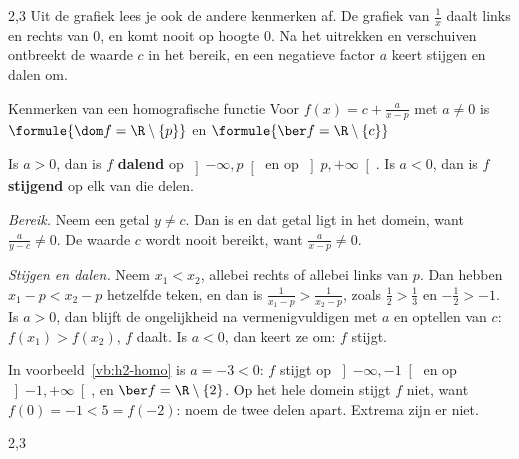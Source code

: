 \begin{alleenvoor}{2,3}
Uit de grafiek lees je ook de andere kenmerken af. De grafiek van $\frac1x$ daalt links en rechts van $0$, en komt nooit op hoogte $0$. Na het uitrekken en verschuiven ontbreekt de waarde $c$ in het bereik, en een negatieve factor $a$ keert stijgen en dalen om.

\begin{theorie}
\begin{stelling}{Kenmerken van een homografische functie}
Voor $f(x) = c + \frac{a}{x - p}$ met $a \neq 0$ is \quad $\formule{\dom f = \R \setminus \{p\}}$ \quad en \quad $\formule{\ber f = \R \setminus \{c\}}$

Is $a > 0$, dan is $f$ \textbf{\textcolor{accent}{dalend}} op $\left]-\infty, p\right[$ en op $\left]p, +\infty\right[$. Is $a < 0$, dan is $f$ \textbf{\textcolor{accent}{stijgend}} op elk van die delen.
\end{stelling}

\begin{bewijs}
\textit{Bereik.} Neem een getal $y \neq c$. Dan is
en dat getal ligt in het domein, want $\frac{a}{y - c} \neq 0$. De waarde $c$ wordt nooit bereikt, want $\frac{a}{x - p} \neq 0$.

\textit{Stijgen en dalen.} Neem $x_1 < x_2$, allebei rechts of allebei links van $p$. Dan hebben $x_1 - p < x_2 - p$ hetzelfde teken, en dan is $\frac{1}{x_1 - p} > \frac{1}{x_2 - p}$, zoals $\frac12 > \frac13$ en $-\frac12 > -1$. Is $a > 0$, dan blijft de ongelijkheid na vermenigvuldigen met $a$ en optellen van $c$: $f(x_1) > f(x_2)$, $f$ daalt. Is $a < 0$, dan keert ze om: $f$ stijgt.
\end{bewijs}
\end{theorie}

In voorbeeld~\ref{vb:h2-homo} is $a = -3 < 0$: $f$ stijgt op $\left]-\infty, -1\right[$ en op $\left]-1, +\infty\right[$, en $\ber f = \R \setminus \{2\}$. Op het hele domein stijgt $f$ niet, want $f(0) = -1 < 5 = f(-2)$: noem de twee delen apart. Extrema zijn er niet.

\end{alleenvoor}
\begin{oefeningen}
\begin{alleenvoor}{2,3}

\end{alleenvoor}
\end{oefeningen}

